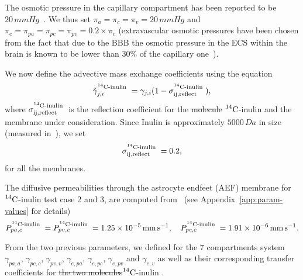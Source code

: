 \documentclass[10pt]{article}
\newcommand{\1}{^{(1)}}
\newcommand{\2}{^{(2)}}
\newcommand{\abs}[1]{\left\lvert#1\right\rvert}
\newcommand{\Cinulin}{$\prescript{14}{}{\text{C}}$-inulin }
\providecommand{\DIFdeltex}[1]{{\protect\color{red}\sout{#1}}}                      %
\providecommand{\DIFaddbegin}{} %
\providecommand{\DIFaddend}{} %
\providecommand{\DIFdelbegin}{} %
\providecommand{\DIFdelend}{} %
\providecommand{\DIFdel}[1]{\texorpdfstring{\DIFdeltex{#1}}{}} %
\newcommand{\DIFscaledelfig}{0.5}
\newlength{\DIFdelgraphicswidth} %
\newlength{\DIFdelgraphicsheight} %
\newcommand{\DIFaddincludegraphics}[2][]{{\color{blue}\fbox{\DIFOincludegraphics[#1]{#2}}}} %
\newcommand{\DIFdelincludegraphics}[2][]{%
\sbox{\DIFdelgraphicsbox}{\DIFOincludegraphics[#1]{#2}}%
\settoboxwidth{\DIFdelgraphicswidth}{\DIFdelgraphicsbox} %
\settoboxtotalheight{\DIFdelgraphicsheight}{\DIFdelgraphicsbox} %
\scalebox{\DIFscaledelfig}{%
\parbox[b]{\DIFdelgraphicswidth}{\usebox{\DIFdelgraphicsbox}\\[-\baselineskip] \rule{\DIFdelgraphicswidth}{0em}}\llap{\resizebox{\DIFdelgraphicswidth}{\DIFdelgraphicsheight}{%
\setlength{\unitlength}{\DIFdelgraphicswidth}%
\begin{picture}(1,1)%
\thicklines\linethickness{2pt} %
{\color[rgb]{1,0,0}\put(0,0){\framebox(1,1){}}}%
{\color[rgb]{1,0,0}\put(0,0){\line( 1,1){1}}}%
{\color[rgb]{1,0,0}\put(0,1){\line(1,-1){1}}}%
\end{picture}%
}\hspace*{3pt}}} %
} %
\DeclareRobustCommand{\DIFaddbegin}{\DIFOaddbegin \let\includegraphics\DIFaddincludegraphics} %
\DeclareRobustCommand{\DIFaddend}{\DIFOaddend \let\includegraphics\DIFOincludegraphics} %
\DeclareRobustCommand{\DIFdelbegin}{\DIFOdelbegin \let\includegraphics\DIFdelincludegraphics} %
\DeclareRobustCommand{\DIFdelend}{\DIFOaddend \let\includegraphics\DIFOincludegraphics} %
\begin{document}

The osmotic pressure in the capillary compartment has been reported to be $20 \, \si{mmHg}$~\cite{Levick-1991-Capillary}. We thus set $\pi_a = \pi_c = \pi_v = 20 \, \si{mmHg}$ and $\pi_e = \pi_{pa} = \pi_{pc} = \pi_{pv} = 0.2\times \pi_c$ (extravascular osmotic pressures have been chosen from the fact that due to the BBB the osmotic pressure in the ECS within the brain is known to be lower than $30\%$ of the capillary one~\cite{Levick-1991-Capillary}).



We now define the advective mass exchange coefficients using the equation
\[
    \tilde \gamma_{j,i}^{\text{\Cinulin}} = \gamma_{j,i}(1-\sigma^{\text{\Cinulin}}_\text{ij,reflect}),  
\]
where $\sigma^\text{\Cinulin}_\text{ij,reflect}$ is the reflection coefficient for the \DIFdelbegin \DIFdel{molecule }\DIFdelend \DIFaddbegin \Cinulin \DIFaddend and the membrane under consideration.
Since Inulin is approximately $5000 \, \si{Da}$ in size (measured in~\cite{trainor1982transcapillary}), we set  
\[
    \sigma^\text{\Cinulin}_\text{ij,reflect} = 0.2,
\]
for all the membranes.

The diffusive permeabilities through the astrocyte endfeet (AEF) membrane for \Cinulin test case 2 and 3, are computed from~\cite{Li-2010-model, Michel-1999-permeablity} (see Appendix~\ref{app:param-values} for details)
\[
    P^{\text{\Cinulin}}_{pa,e} =  P^{\text{\Cinulin}}_{pv,e} =  1.25\times 10^{-5}\, \si{mm.s^{-1}},\quad P^{\text{\Cinulin}}_{pc,e} = 1.91\times 10^{-6} \, \si{mm.s^{-1}}.
\]

From the two previous parameters, we defined for the $7$ compartments system $\gamma_{pa , a}$, $\gamma_{pc , c}$, $\gamma_{pv , v}$, $\gamma_{e , pa}$, $\gamma_{e , pc}$, $\gamma_{e , pv}$ and $\gamma_{e, v}$ as well as their corresponding transfer coefficients for \DIFdelbegin \DIFdel{the two molecules}\DIFdelend \DIFaddbegin \Cinulin\DIFaddend .
\end{document}
